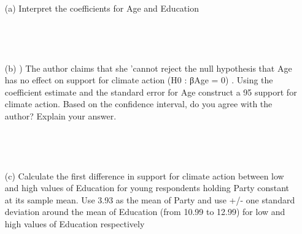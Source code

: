 \documentclass[12pt,letterpaper]{article}
\begin{document}
{\begin{enumerate}
			\section*{Question 5: Climate Action}
			The following is a regression where the outcome measures individuals’ desire to combat
			climate change as indicated by feeling thermometer ratings (the variable ranges from 0 to 100
			where 100 indicates high levels of support for action to combat climate change). Researchers
			use three explanatory variables in their regression. First, they include a standard 7-point
			party identification measure that ranges from 1-‘Strong Republican’ to 7-‘Strong Democrat’
			(Party). Second, they include a dummy variable (0 or 1) indicating whether the respondent
			is below the age of 70, or 70 and above (Age). Last, the researchers have information on
			the number of years that respondents attended school (Education). The regression includes
			N=1194 observations.
			
			\item [(a)]  Interpret the coefficients for Age and Education
			
			
			\begin{verbatim}
				
				
				
			\end{verbatim}
			\item [(b)] ) The author claims that she ’cannot reject the null hypothesis that Age has no effect
			on support for climate action (H0 : βAge = 0) . Using the coefficient estimate and the
			standard error for Age construct a 95%
			support for climate action. Based on the confidence interval, do you agree with the
			author? Explain your answer.
			
			\begin{verbatim}
				
				
				
			\end{verbatim}
			\item [(c)] Calculate the first difference in support for climate action between low and high values
			of Education for young respondents holding Party constant at its sample mean. Use
			3.93 as the mean of Party and use +/- one standard deviation around the mean of
			Education (from 10.99 to 12.99) for low and high values of Education respectively
			
			\begin{verbatim}
				

\end{verbatim}
\end{enumerate}}
\end{document}
